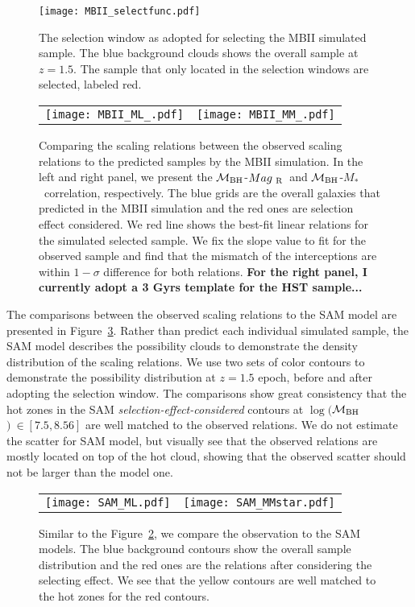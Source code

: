 \documentclass{natureprintstyle}
\newcommand{\mbh}{$\mathcal M_{\rm BH}$}
\newcommand{\mr}{$Mag_{\rm ~R}$}
\newcommand{\mstar}{{$M_*$}}
\begin{document}
\begin{figure}[t]
\texttt{[image: MBII\_selectfunc.pdf]}
\caption{The selection window as adopted for selecting the MBII simulated sample. The blue background clouds shows the overall sample at $z=1.5$. The sample that only located in the selection windows are selected, labeled red.
}
\label{fig:selectfunc}
\end{figure}

\begin{figure*}[t]%
\begin{tabular}{c c}
\texttt{[image: MBII\_ML\_.pdf]} &
\texttt{[image: MBII\_MM\_.pdf]} \\
\end{tabular}
\caption{
Comparing the scaling relations between the observed scaling relations to the predicted samples by the MBII simulation. In the left and right panel, we present the \mbh-\mr\ and \mbh-\mstar\ correlation, respectively. The blue grids are the overall galaxies that predicted in the MBII simulation and the red ones are selection effect considered. We red line shows the best-fit linear relations for the simulated selected sample. We fix the slope value to fit for the observed sample and find that the mismatch of the interceptions are within $1-\sigma$ difference for both relations. {\bf For the right panel, I currently adopt a 3 Gyrs template for the HST sample...}
}
\label{fig:MBII_comp}
\end{figure*}

The comparisons between the observed scaling relations to the SAM model are presented in Figure~\ref{fig:SAM_comp}. Rather than predict each individual simulated sample, the SAM model describes the possibility clouds to demonstrate the density distribution of the scaling relations. We use two sets of color contours to demonstrate the possibility distribution at $z=1.5$ epoch, before and after adopting the selection window. The comparisons show great consistency that the hot zones in the SAM {\it selection-effect-considered} contours at $\log($\mbh$)~\in[7.5, 8.56]$ are well matched to the observed relations. We do not estimate the scatter for SAM model, but visually see that the observed relations are mostly located on top of the hot cloud, showing that the observed scatter should not be larger than the model one.

\begin{figure*}[t]%
\begin{tabular}{c c}
\texttt{[image: SAM\_ML.pdf]} &
\texttt{[image: SAM\_MMstar.pdf]} \\
\end{tabular}
\caption{ Similar to the Figure~\ref{fig:MBII_comp}, we compare the observation to the SAM models. The blue background contours show the overall sample distribution and the red ones are the relations after considering the selecting effect. We see that the yellow contours are well matched to the hot zones for the red contours.
}
\label{fig:SAM_comp}
\end{figure*}
\end{document}
